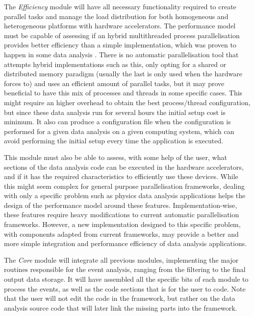 The \textit{Efficiency} module will have all necessary functionality required to create parallel tasks and manage the load distribution for both homogeneous and heterogeneous platforms with hardware accelerators. The performance model must be capable of assessing if an hybrid multithreaded process parallelisation provides better efficiency than a simple implementation, which was proven to happen in some data analysis \cite{paperAMP}. There is no automatic parallelisation tool that attempts hybrid implementations such as this, only opting for a shared or distributed memory paradigm (usually the last is only used when the hardware forces to) and uses an efficient amount of parallel tasks, but it may prove beneficial to have this mix of processes and threads in some specific cases. This might require an higher overhead to obtain the best process/thread configuration, but since these data analysis run for several hours the initial setup cost is minimum. It also can produce a configuration file when the configuration is performed for a given data analysis on a given computing system, which can avoid performing the initial setup every time the application is executed.

This module must also be able to assess, with some help of the user, what sections of the data analysis code can be executed in the hardware accelerators, and if it has the required characteristics to efficiently use these devices. While this might seem complex for general purpose parallelisation frameworks, dealing with only a specific problem such as physics data analysis applications helps the design of the performance model around these features. Implementation-wise, these features require heavy modifications to current automatic parallelisation frameworks. However, a new implementation designed to this specific problem, with components adapted from current frameworks, may provide a better and more simple integration and performance efficiency of data analysis applications.

The \textit{Core} module will integrate all previous modules, implementing the major routines responsible for the event analysis, ranging from the filtering to the final output data storage. It will have assembled all the specific bits of each module to process the events, as well as the code sections that is for the user to code. Note that the user will not edit the code in the framework, but rather on the data analysis source code that will later link the missing parts into the framework.

